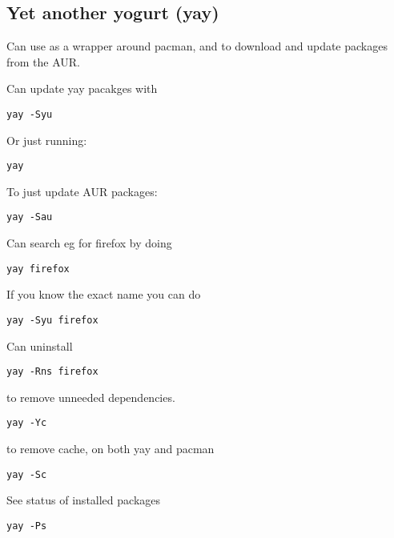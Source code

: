 
\subsection{Yet another yogurt (yay)}

Can use as a wrapper around pacman, and to download and update packages from the AUR.

Can update yay pacakges with 

\begin{verbatim}
yay -Syu
\end{verbatim}

Or just running:

\begin{verbatim}
yay
\end{verbatim}

To just update AUR packages:

\begin{verbatim}
yay -Sau
\end{verbatim}

Can search eg for firefox by doing 

\begin{verbatim}
yay firefox
\end{verbatim}

If you know the exact name you can do
\begin{verbatim}
yay -Syu firefox
\end{verbatim}

Can uninstall

\begin{verbatim}
yay -Rns firefox
\end{verbatim}

to remove unneeded dependencies.
\begin{verbatim}
yay -Yc
\end{verbatim}

to remove cache, on both yay and pacman
\begin{verbatim}
yay -Sc
\end{verbatim}

See status of installed packages

\begin{verbatim}
yay -Ps
\end{verbatim}


